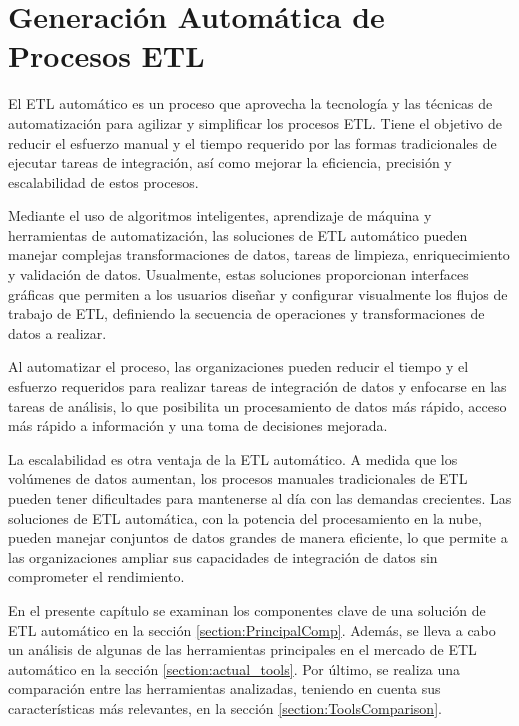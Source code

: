 \chapter{Generaci\'on Autom\'atica de Procesos ETL}\label{chapter:auto-etl}

El ETL automático es un proceso que 
aprovecha la tecnología y las técnicas de automatización para agilizar y simplificar los procesos ETL. Tiene el objetivo 
de reducir el esfuerzo manual y el tiempo requerido por las formas tradicionales de ejecutar tareas de integración, 
as\'i como mejorar la eficiencia, precisión y escalabilidad de estos procesos.

Mediante el uso de algoritmos inteligentes, aprendizaje de m\'aquina y herramientas de automatización, las soluciones de 
ETL automático pueden manejar complejas transformaciones de datos, tareas de limpieza, enriquecimiento 
y validación de datos. Usualmente, estas soluciones proporcionan interfaces gráficas que permiten a los 
usuarios diseñar y configurar visualmente los flujos de trabajo de ETL, definiendo la secuencia de operaciones y 
transformaciones de datos a realizar.

Al automatizar el proceso, las 
organizaciones pueden reducir el tiempo y el esfuerzo requeridos para realizar tareas de integración de 
datos y enfocarse en las tareas de an\'alisis, lo que posibilita un procesamiento de datos más rápido, acceso más rápido 
a información y una toma de decisiones mejorada.

La escalabilidad es otra ventaja de la ETL automático. A medida que los volúmenes de datos aumentan, los procesos manuales 
tradicionales de ETL pueden tener dificultades para mantenerse al día con las demandas crecientes. Las soluciones de ETL 
automática, con la potencia del procesamiento en la nube, pueden manejar conjuntos de datos grandes de manera eficiente, 
lo que permite a las organizaciones ampliar sus capacidades de integración de datos sin comprometer el rendimiento.

En el presente cap\'itulo se examinan los componentes clave de una solución de ETL automático en la sección 
\ref{section:PrincipalComp}. Además, se lleva a cabo un análisis de algunas de las herramientas principales en el 
mercado de ETL automático en la sección \ref{section:actual_tools}. Por último, se realiza una comparación entre las 
herramientas analizadas, teniendo en cuenta sus características más relevantes, en la sección 
\ref{section:ToolsComparison}. 

